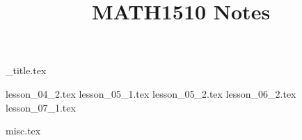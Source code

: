 \documentclass{article}
\title{MATH1510 Notes}
\author{}
\date{}
\begin{document}
{_title.tex}

\tableofcontents

{lesson_04_2.tex}
{lesson_05_1.tex}
{lesson_05_2.tex}
{lesson_06_2.tex}
{lesson_07_1.tex}

{misc.tex}
\end{document}
